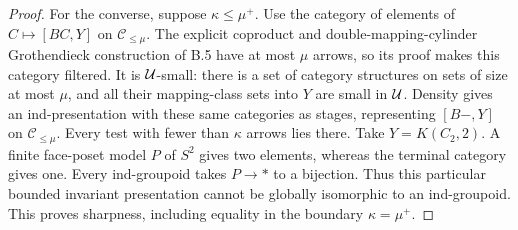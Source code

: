 \begin{proof}
For the converse, suppose $\kappa\leq\mu^+$. Use the category of elements of $C\mapsto[BC,Y]$ on $\mathcal C_{\leq\mu}$. The explicit coproduct and double-mapping-cylinder Grothendieck construction of B.5 have at most $\mu$ arrows, so its proof makes this category filtered. It is $\mathcal U$-small: there is a set of category structures on sets of size at most $\mu$, and all their mapping-class sets into $Y$ are small in $\mathcal U$. Density gives an ind-presentation with these same categories as stages, representing $[B-,Y]$ on $\mathcal C_{\leq\mu}$. Every test with fewer than $\kappa$ arrows lies there. Take $Y=K(C_2,2)$. A finite face-poset model $P$ of $S^2$ gives two elements, whereas the terminal category gives one. Every ind-groupoid takes $P\to *$ to a bijection. Thus this particular bounded invariant presentation cannot be globally isomorphic to an ind-groupoid. This proves sharpness, including equality in the boundary $\kappa=\mu^+$.
\end{proof}

